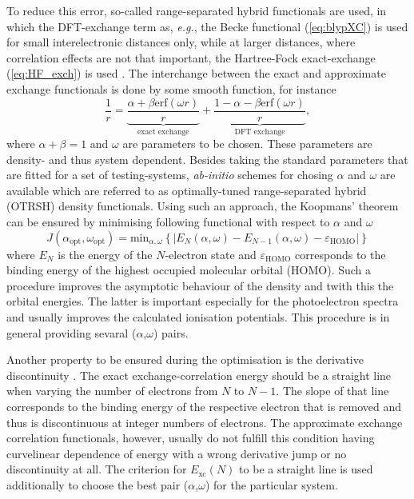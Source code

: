 To reduce this error, so-called range-separated hybrid functionals are used, in which the DFT-exchange term as, \textit{e.g.}, the Becke functional (\ref{eq:blypXC}) is used for small interelectronic distances only, while at larger distances, where correlation effects are not that important, the Hartree-Fock exact-exchange (\ref{eq:HF_exch}) is used \cite{LC-tddft}.
The interchange between the exact and approximate exchange functionals is done by some smooth function, for instance
\begin{equation}
   \frac 1r = \underbrace{\frac{\alpha +\beta \text{erf}(\omega r)}{r}}_{\text{exact exchange}} +\underbrace{\frac{1-\alpha-\beta \text{erf}(\omega r)}{r}}_{\text{DFT exchange}},
\end{equation}
where $\alpha+\beta=1$ and $\omega$ are parameters to be chosen.
These parameters are density- and thus system dependent.
Besides taking the standard parameters that are fitted for a set of testing-systems, \textit{ab-initio} schemes for chosing $\alpha$ and $\omega$ are available which are referred to as optimally-tuned range-separated hybrid (OTRSH) density functionals.
Using such an approach, the Koopmans' theorem can be ensured by minimising following functional with respect to $\alpha$ and $\omega$ \cite{Bokareva}
\begin{equation}\label{eq:J_ao}
   J(\alpha_\text{opt},\omega_\text{opt})=\text{min}_{\alpha, \omega} \left\{ |E_N(\alpha,\omega)-E_{N-1}(\alpha,\omega)-\varepsilon_\text{HOMO}| \right\}
\end{equation}
where $E_N$ is the energy of the $N$-electron state and $\varepsilon_\text{HOMO}$ corresponds to the binding energy of the highest occupied molecular orbital (HOMO).
Such a procedure improves the asymptotic behaviour of the density and twith this the orbital energies.
The latter is important especially for the photoelectron spectra and usually improves the calculated ionisation potentials.
This procedure is in general providing sevaral ($\alpha$,$\omega$) pairs.

Another property to be ensured during the optimisation is the derivative discontinuity \cite{derdis,sanchez,Autschbach}.
The exact exchange-correlation energy should be a straight line when varying the number of electrons from $N$ to $N-1$.
The slope of that line corresponds to the binding energy of the respective electron that is removed and thus is discontinuous at integer numbers of electrons.
The approximate exchange correlation functionals, however, usually do not fulfill this condition having curvelinear dependence of energy with a wrong derivative jump or no discontinuity at all.
The criterion for $E_\text{xc}(N)$ to be a straight line is used additionally to choose the best pair ($\alpha$,$\omega$) for the particular system.

